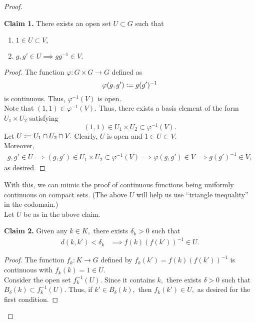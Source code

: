 \documentclass[12pt]{article}
\newenvironment{blockquote}
{\begin{mdframed}[skipabove=0pt, skipbelow=0pt, innertopmargin=4pt, innerbottommargin=4pt, bottomline=false,topline=false,rightline=false, linewidth=2pt]}
{\end{mdframed}}
\begin{document}
\begin{proof} \phantom{hi}

	\begin{blockquote}
		\textbf{Claim 1.} There exists an open set $U \subset G$ such that
		\begin{enumerate}
			\item $1 \in U \subset V,$
			\item $g, g' \in U \implies gg^{-1} \in V.$
		\end{enumerate}
		\begin{proof} 
			The function $\varphi:G \times G \to G$ defined as
			\begin{equation*} 
				\varphi(g, g') \vcentcolon= g(g')^{-1}
			\end{equation*}
			is continuous. Thus, $\varphi^{-1}(V)$ is open.\\
			Note that $(1, 1) \in \varphi^{-1}(V).$ Thus, there exists a basis element of the form $U_1 \times U_2$ satisfying
			\begin{equation*} 
				(1, 1) \in U_1 \times U_2 \subset \varphi^{-1}(V).
			\end{equation*}
			Let $U\vcentcolon= U_1 \cap U_2 \cap V.$ Clearly, $U$ is open and $1 \in U \subset V.$ \\
			Moreover,
			\begin{align*} 
				g, g' \in U \implies (g, g') \in U_1 \times U_2 \subset \varphi^{-1}(V) \implies \varphi(g, g') \in V \implies g(g')^{-1} \in V,
			\end{align*}
			as desired.
		\end{proof}
	\end{blockquote}
		With this, we can mimic the proof of continuous functions being uniformly continuous on compact sets. (The above $U$ will help us use ``triangle inequality'' in the codomain.)\\
		Let $U$ be as in the above claim.\\
	\begin{blockquote}
		\textbf{Claim 2.} Given any $k \in K,$ there exists $\delta_k > 0$ such that
		\begin{align*} 
			d(k, k') < \delta_k &\implies f(k)(f(k'))^{-1} \in U.	
		\end{align*}
		\begin{proof} 
			The function $f_k : K \to G$ defined by $f_k(k') = f(k)(f(k'))^{-1}$ is continuous with $f_k(k) = 1 \in U.$\\
			Consider the open set $f_k^{-1}(U).$ Since it contains $k,$ there exists $\delta > 0$ such that $B_\delta(k) \subset f_k^{-1}(U).$ Thus, if $k' \in B_\delta(k),$ then $f_k(k') \in U,$ as desired for the first condition.


\end{proof}
\end{blockquote}
\end{proof}
\end{document}
